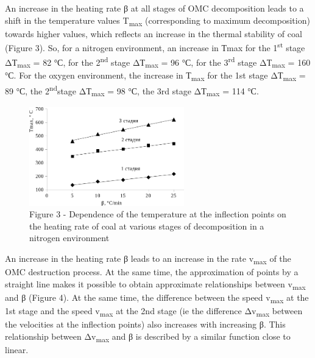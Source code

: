 \begin{multicols}{2}
An increase in the heating rate β at all stages of OMC decomposition
leads to a shift in the temperature values T\textsubscript{max}
(corresponding to maximum decomposition) towards higher values, which
reflects an increase in the thermal stability of coal (Figure 3). So,
for a nitrogen environment, an increase in Тmax for the
1\textsuperscript{st} stage ΔТ\textsubscript{max} = 82 °С, for the
2\textsuperscript{nd} stage ΔТ\textsubscript{max} = 96 °С, for the
3\textsuperscript{rd} stage ΔТ\textsubscript{max} = 160 °С. For the
oxygen environment, the increase in Т\textsubscript{max} for the 1st
stage ΔТ\textsubscript{max} = 89 °С, the 2\textsuperscript{nd}stage
ΔТ\textsubscript{max} = 98 °С, the 3rd stage ΔТ\textsubscript{max} = 114
°С.
\end{multicols}

\begin{figure}[H]
	\centering
	\includegraphics[width=0.6\textwidth]{assets/1087}
	\caption*{Figure 3 - Dependence of the temperature at the inflection points on the heating rate of coal at various stages of decomposition in a nitrogen environment}
\end{figure}

\begin{multicols}{2}
An increase in the heating rate β leads to an increase in the rate
v\textsubscript{max} of the OMC destruction process. At the same time,
the approximation of points by a straight line makes it possible to
obtain approximate relationships between v\textsubscript{max} and β
(Figure 4). At the same time, the difference between the speed
v\textsubscript{max} at the 1st stage and the speed v\textsubscript{max}
at the 2nd stage (ie the difference Δv\textsubscript{max} between the
velocities at the inflection points) also increases with increasing β.
This relationship between Δv\textsubscript{max} and β is described by a
similar function close to linear.
\end{multicols}

